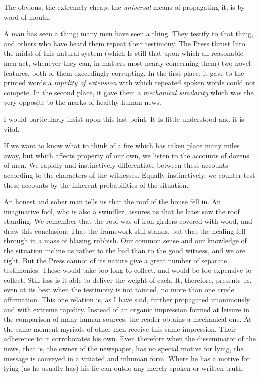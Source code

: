 \documentclass{book}
\begin{document}
The obvious, the extremely cheap, the \emph{universal} means of propagating it, is by word of mouth.

A man has seen a thing; many men have seen a thing. They testify to that thing, and others who have heard them repeat their testimony. The Press thrust Into the midst of this natural system (which Is still that upon which all reasonable men act, whenever they can, in matters most nearly concerning them) two novel features, both of them exceedingly corrupting. In the first place, it gave to the printed words a \emph{rapidity of extension} with which repeated spoken words could not compete. In the second place, it gave them a \emph{mechanical similarity} which was the very opposite to the marks of healthy human news.

I would particularly insist upon this last point. It Is little understood and it is vital.

If we want to know what to think of a fire which has taken place many miles away, but which affects property of our own, we listen to the accounts of dozens of men. We rapidly and instinctively differentiate between these accounts according to the characters of the witnesses. Equally instinctively, we counter-test these accounts by the inherent probabilities of the situation.

An honest and sober man tells us that the roof of the house fell in. An imaginative fool, who is also a swindler, assures us that he later saw the roof standing. We remember that the roof was of iron girders covered with wood, and draw this conclusion: That the framework still stands, but that the healing fell through in a mass of blazing rubbish. Our common sense and our knowledge of the situation incline us rather to the bad than to the good witness, and we are right. But the Press cannot of its nature give a great number of separate testimonies. These would take too long to collect, and would be too expensive to collect. Still less is it able to deliver the weight of each. It, therefore, presents us, even at its best when the testimony is not tainted, no more than one crude affirmation. This one relation is, as I have said, further propagated unanimously and with extreme rapidity. Instead of an organic impression formed at leisure in the comparison of many human sources, the reader obtains a mechanical one. At the same moment myriads of other men receive this same impression. Their adherence to it corroborates his own. Even therefore when the disseminator of the news, that is, the owner of the newspaper, has no special motive for lying, the message is conveyed in a vitiated and inhuman form. Where he has a motive for lying (as he usually has) his lie can outdo any merely spoken or written truth.
\end{document}
